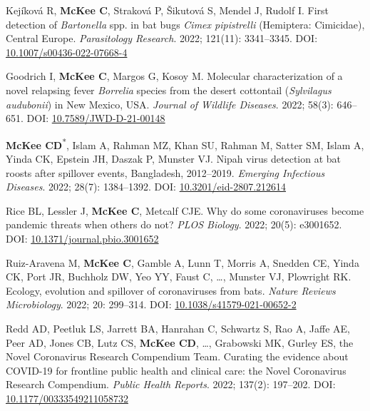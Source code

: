 \documentclass{cv}
\begin{document}
\begin{pubenum}
\item Kejíková R, \textbf{McKee C}, Straková P, Šikutová S, Mendel J, Rudolf I. First detection of \textit{Bartonella} spp. in bat bugs \textit{Cimex pipistrelli} (Hemiptera: Cimicidae), Central Europe. \textit{Parasitology Research}. 2022; 121(11): 3341--3345. DOI: \href{https://doi.org/10.1007/s00436-022-07668-4}{10.1007/s00436-022-07668-4}

\item Goodrich I, \textbf{McKee C}, Margos G, Kosoy M. Molecular characterization of a novel relapsing fever \textit{Borrelia} species from the desert cottontail (\textit{Sylvilagus audubonii}) in New Mexico, USA. \textit{Journal of Wildlife Diseases}. 2022; 58(3): 646--651. DOI: \href{https://doi.org/10.7589/JWD-D-21-00148}{10.7589/JWD-D-21-00148}

\item \textbf{McKee CD}\textsuperscript{*\dag}, Islam A\textsuperscript{\dag}, Rahman MZ, Khan SU, Rahman M, Satter SM, Islam A, Yinda CK, Epstein JH, Daszak P, Munster VJ. Nipah virus detection at bat roosts after spillover events, Bangladesh, 2012--2019. \textit{Emerging Infectious Diseases}. 2022; 28(7): 1384--1392. DOI: \href{https://doi.org/10.3201/eid2807.212614}{10.3201/eid-2807.212614}

\item Rice BL\textsuperscript{\dag}, Lessler J\textsuperscript{\dag}, \textbf{McKee C}\textsuperscript{\dag}, Metcalf CJE\textsuperscript{\dag}. Why do some coronaviruses become pandemic threats when others do not? \textit{PLOS Biology}. 2022; 20(5): e3001652. DOI: \href{https://doi.org/10.1371/journal.pbio.3001652}{10.1371/journal.pbio.3001652}

\item Ruiz-Aravena M\textsuperscript{\dag}, \textbf{McKee C}\textsuperscript{\dag}, Gamble A, Lunn T, Morris A, Snedden CE, Yinda CK, Port JR, Buchholz DW, Yeo YY, Faust C, …, Munster VJ, Plowright RK. Ecology, evolution and spillover of coronaviruses from bats. \textit{Nature Reviews Microbiology}. 2022; 20: 299--314. DOI: \href{https://doi.org/10.1038/s41579-021-00652-2}{10.1038/s41579-021-00652-2}

\item Redd AD, Peetluk LS, Jarrett BA, Hanrahan C, Schwartz S, Rao A, Jaffe AE, Peer AD, Jones CB, Lutz CS, \textbf{McKee CD}, …, Grabowski MK, Gurley ES, the Novel Coronavirus Research Compendium Team. Curating the evidence about COVID-19 for frontline public health and clinical care: the Novel Coronavirus Research Compendium. \textit{Public Health Reports}. 2022; 137(2): 197--202. DOI: \href{https://doi.org/10.1177/00333549211058732}{10.1177/00333549211058732}


\end{pubenum}
\end{document}
